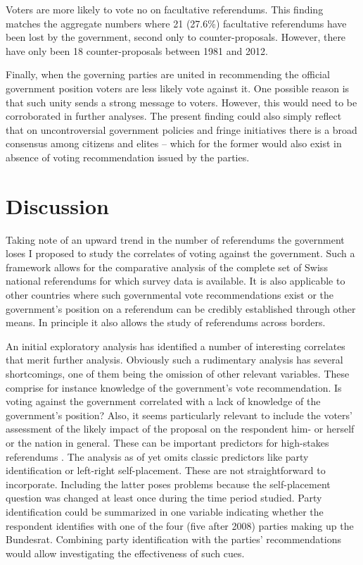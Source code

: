 \documentclass[11pt,a4paper]{article}\usepackage[]{graphicx}\usepackage[]{color}
\begin{document}
    Voters are more likely to vote no on facultative referendums. This finding matches the aggregate numbers where 21 (27.6\%) facultative referendums have been lost by the government, second only to counter-proposals. However, there have only been 18 counter-proposals between 1981 and 2012.
    
    Finally, when the governing parties are united in recommending the official government position voters are less likely vote against it. One possible reason is that such unity sends a strong message to voters. However, this would need to be corroborated in further analyses. The present finding could also simply reflect that on uncontroversial government policies and fringe initiatives there is a broad consensus among citizens and elites -- which for the former would also exist in absence of voting recommendation issued by the parties. 
    
    \section{Discussion}\label{sec:discussion}
    
    
    Taking note of an upward trend in the number of referendums the government loses I proposed to study the correlates of voting against the government. Such a framework allows for the comparative analysis of the complete set of Swiss national referendums for which survey data is available. It is also applicable to other countries where such governmental vote recommendations exist or the government's position on a referendum can be credibly established through other means. In principle it also allows the study of referendums across borders. 
    
    An initial exploratory analysis has identified a number of interesting correlates that merit further analysis. Obviously such a rudimentary analysis has several shortcomings, one of them being the omission of other relevant variables. %
    These comprise for instance knowledge of the government's vote recommendation. Is voting against the government correlated with a lack of knowledge of the government's position? Also, it seems particularly relevant to include the voters' assessment of the likely impact of the proposal on the respondent him- or herself or the nation in general. These can be important predictors for high-stakes referendums \citep{nadeau_attitude_1999}. The analysis as of yet omits classic predictors like party identification or left-right self-placement. These are not straightforward to incorporate. Including the latter poses problems because the self-placement question was changed at least once during the time period studied. Party identification could be summarized in one variable indicating whether the respondent identifies with one of the four (five after 2008) parties making up the Bundesrat. Combining party identification with the parties' recommendations would allow investigating the effectiveness of such cues. 
    
\end{document}
